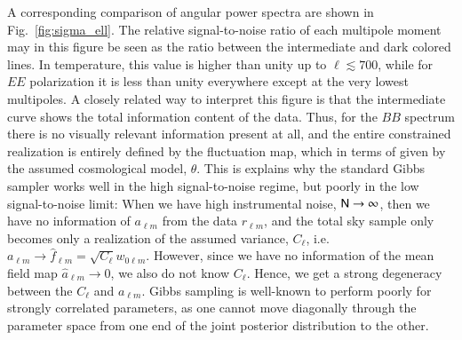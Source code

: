 \documentclass[twocolumn]{../common/aa}
\newcommand{\N}[0]{\tens{N}}
\begin{document}
A corresponding comparison of angular power spectra are shown in Fig.~\ref{fig:sigma_ell}. The relative signal-to-noise ratio of each multipole moment may in this figure be seen as the ratio between the intermediate and dark colored lines. In temperature, this value is higher than unity up to $\ell\lesssim700$, while for $EE$ polarization it is less than unity everywhere except at the very lowest multipoles. A closely related way to interpret this figure is that the intermediate curve shows the total information content of the data. Thus, for the $BB$ spectrum there is no visually relevant information present at all, and the entire constrained realization is entirely defined by the fluctuation map, which in terms of given by the assumed cosmological model, $\theta$. This is explains why the standard Gibbs sampler works well in the high signal-to-noise regime, but poorly in the low signal-to-noise limit: When we have high instrumental noise, $\N \rightarrow \infty$, then we have no information of $a_{\ell m}$ from the data $r_{\ell m}$, and the total sky sample only becomes only a realization of the assumed variance, $C_{\ell}$, i.e. $a_{\ell m} \rightarrow \hat{f}_{\ell m} = \sqrt{C_{\ell}} w_{0\ell m}$. However, since we have no information of the mean field map $\hat{a}_{\ell m} \rightarrow 0$, we also do not know $C_\ell$. Hence, we get a strong degeneracy between the $C_\ell$ and $a_{\ell m}$. Gibbs sampling is well-known to perform poorly for strongly correlated parameters, as one cannot move diagonally through the parameter space from one end of the joint posterior distribution to the other. 
\end{document}
